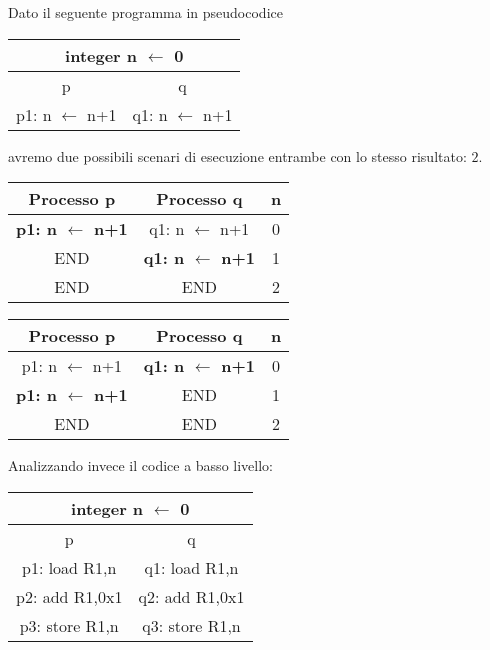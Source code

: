 \begin{example}
	Dato il seguente programma in pseudocodice
	\begin{center}
		\begin{tabular}{|c|c|}
			\hline
			\multicolumn{2}{c}{integer n $\leftarrow$ 0 }\\
			\hline
			p & q \\
			\hline
			p1: n $\leftarrow$ n+1 & q1: n $\leftarrow$ n+1\\
			\hline
		\end{tabular}
	\end{center}
	avremo due possibili scenari di esecuzione entrambe con lo stesso risultato: $2$.
	\begin{center}
		\begin{tabular}{|c|c|c|}
			\hline
			\textbf{Processo p} & \textbf{Processo q} & \textbf{n} \\
			\hline
			\textbf{p1: n $\leftarrow$ n+1} & q1: n $\leftarrow$ n+1 & 0 \\
			\hline
			END & \textbf{q1: n $\leftarrow$ n+1} & 1 \\
			\hline
			END & END & 2 \\
			\hline
		\end{tabular}
		\hspace{50px}
		\begin{tabular}{|c|c|c|}
			\hline
			\textbf{Processo p} & \textbf{Processo q} & \textbf{n} \\
			\hline
			p1: n $\leftarrow$ n+1 & \textbf{q1: n $\leftarrow$ n+1} & 0 \\
			\hline
			\textbf{p1: n $\leftarrow$ n+1} & END & 1 \\
			\hline
			END & END & 2 \\
			\hline
		\end{tabular}
	\end{center}
	\noindent Analizzando invece il codice a basso livello:
	\begin{center}
		\begin{tabular}{|c|c|}
			\hline
			\multicolumn{2}{c}{integer n $\leftarrow$ 0 }\\
			\hline
			p & q \\
			\hline
			p1: load R1,n & q1: load R1,n \\
			p2: add R1,0x1 & q2: add R1,0x1 \\
			p3: store R1,n & q3: store R1,n \\
			\hline
		\end{tabular}
	\end{center}

\end{example}
